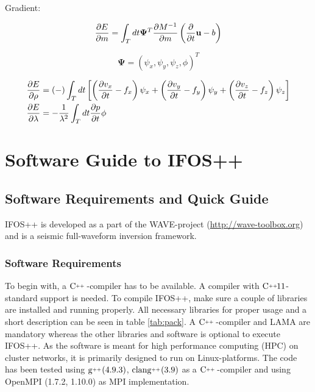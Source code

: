 \documentclass[pdftex,a4paper,parskip,listof=totoc,bibliography=totoc,onehalfspacing,12pt]{scrreprt}
\newcommand{\CC}[1][]{$\text{C\hspace{0ex}}^{_{_{_{++}}}}					%
                      \ifthenelse{\equal{#1}{}}{}{\text{\hspace{-.625ex}#1}}$}
\newcommand{\clang}[1][]{$\text{clang\hspace{0ex}}^{_{_{_{++}}}}		%
                      \ifthenelse{\equal{#1}{}}{}{\text{\hspace{-.25ex}(#1)}}$}
\newcommand{\gCC}[1][]{$\text{g\hspace{0ex}}^{_{_{_{++}}}}				%
                      \ifthenelse{\equal{#1}{}}{}{\text{\hspace{-.25ex}(#1)}}$}
\begin{document}
\begin{center} \Large{Gradient:}\end{center}

\begin{equation}
 \pdv{E}{m}=\int_T dt\mathbf{\Psi}^T \pdv{M^{-1}}{m}\left( \pdv{}{t}\mathbf{u}-b \right)
\end{equation}

\begin{equation}
\mathbf{ \Psi}=\left(\psi_x,\psi_y,\psi_z,\phi\right)^T
\end{equation}

\begin{align}
 \pdv{E}{\rho}&= (-)\int_T dt \left[ \left(\pdv{v_x}{t}-f_x\right)\psi_x +\left(\pdv{v_y}{t}-f_y\right)\psi_y +\left(\pdv{v_z}{t}-f_z\right)\psi_z \right]\\
 \pdv{E}{\lambda}&=- \frac{1}{\lambda^2}\int_T dt  \pdv{p}{t}\phi \\
\end{align}



\part{Software Guide to IFOS++}
\chapter{Software Requirements and Quick Guide}

IFOS++ is developed as a part of the WAVE-project (\url{http://wave-toolbox.org}) and is a seismic full-waveform inversion framework. 

\section{Software Requirements}

To begin with, a \CC-compiler has to be available. A compiler with  \CC[11]-standard support is needed. To compile IFOS++, make sure a couple of libraries are installed and running properly. All necessary libraries for proper usage and a short description can be seen in table \ref{tab:pack}. A \CC-compiler and LAMA are mandatory whereas the other libraries and software is optional to execute IFOS++.
As the software is meant for high performance computing (HPC) on cluster networks, it is primarily designed to run on Linux-platforms. The code has been tested using \gCC[4.9.3], \clang[3.9] as a  \CC-compiler and using OpenMPI (1.7.2, 1.10.0) as MPI implementation.
\end{document}
